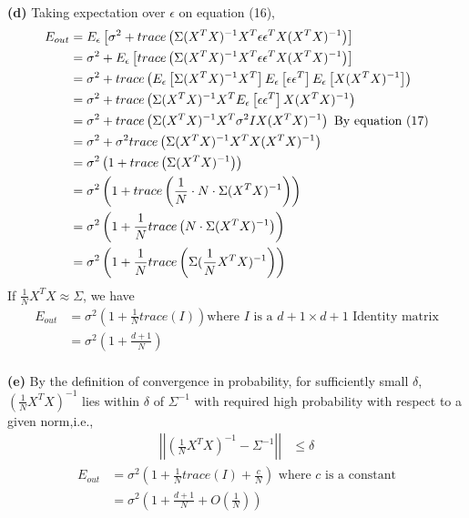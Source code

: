 \documentclass[12pt]{article}
\newcommand{\e}[0]{\epsilon}
\begin{document}
\textbf{(d)} Taking expectation over \(\e\) on equation (16),
\begin{align}\nonumber
    E_{out} & = E_\e\left[ \sigma^2 + trace\left(\Sigma(X^TX)^{-1}X^T{\bf \e}{\bf \e}^TX(X^TX)^{-1} \right) \right] \\ \nonumber
    & = \sigma^2 + E_\e\left[trace\left(\Sigma(X^TX)^{-1}X^T{\bf \e}{\bf \e}^TX(X^TX)^{-1} \right) \right] \\ \nonumber
    & = \sigma^2 + trace\left(E_\e\left[\Sigma(X^TX)^{-1}X^T\right]E_\e\left[{\bf \e}{\bf \e}^T\right]E_\e\left[X(X^TX)^{-1}\right] \right) \\ \nonumber
    & = \sigma^2 + trace\left(\Sigma(X^TX)^{-1}X^TE_\e\left[{\bf \e}{\bf \e}^T\right]X(X^TX)^{-1} \right) \\ \nonumber
    & = \sigma^2 + trace\left(\Sigma(X^TX)^{-1}X^T\sigma^2IX(X^TX)^{-1} \right) \text{ By equation (17)}\\ \nonumber
    & = \sigma^2 + \sigma^2trace\left(\Sigma(X^TX)^{-1}X^TX(X^TX)^{-1} \right) \\ \nonumber
    & = \sigma^2\left(1 + trace\left(\Sigma(X^TX)^{-1} \right)\right) \\ \nonumber
    & = \sigma^2\left(1 + trace\left(\frac{1}{N}\cdot N \cdot\Sigma(X^TX)^{-1} \right)\right) \\ \nonumber
    & = \sigma^2\left(1 + \frac{1}{N}trace\left(N \cdot\Sigma(X^TX)^{-1} \right)\right) \\ 
    & = \sigma^2\left(1 + \frac{1}{N}trace\left( \Sigma(\frac{1}{N}X^TX)^{-1} \right)\right)
\end{align}
If \(\frac{1}{N}X^TX \approx \Sigma\), we have
\begin{align*}
    E_{out} & = \sigma^2\left(1 + \frac{1}{N}trace\left( I \right)\right) \text{where \(I\) is a \(d+1 \times d+1\) Identity matrix} \\ \nonumber
    & = \sigma^2\left(1 + \frac{d+1}{N}\right) \\ \nonumber
\end{align*}

\textbf{(e)}
By the definition of convergence in probability, for sufficiently small \(\delta\), \((\frac{1}{N}X^TX)^{-1}\) lies within \(\delta\) of \(\Sigma^{-1}\) with required high probability with respect to a given norm,i.e.,
\begin{align}
    \left|\left|\left(\frac{1}{N}X^TX\right)^{-1} - \Sigma^{-1}\right|\right| & \leq \delta
\end{align}
\begin{align}\nonumber
    E_{out} & = \sigma^2\left(1 + \frac{1}{N}trace\left( I \right) + \frac{c}{N}\right) \text{ where \(c\) is a constant}\\ 
    & = \sigma^2\left(1 + \frac{d+1}{N} + O\left(\frac{1}{N}\right)\right)
\end{align}
\end{document}
